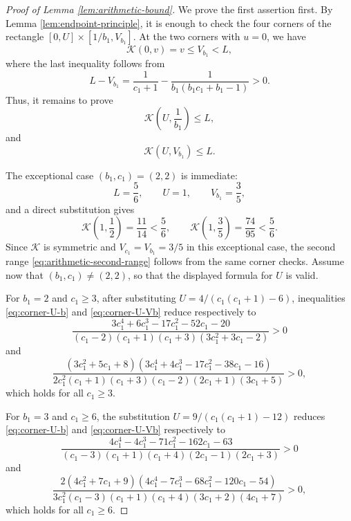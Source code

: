 \documentclass[10pt,a4paper]{amsart}
\newcommand{\Kfun}{\mathcal K}
\begin{document}
\begin{proof}[Proof of Lemma \ref{lem:arithmetic-bound}]
We prove the first assertion first.  By Lemma \ref{lem:endpoint-principle}, it
is enough to check the four corners of the rectangle
$[0,U]\times[1/b_1,V_{b_1}]$.  At the two corners with $u=0$, we have
$$
        \Kfun(0,v)=v\le V_{b_1}<L,
$$
where the last inequality follows from
$$
        L-V_{b_1}
        =\frac1{c_1+1}-\frac1{b_1(b_1c_1+b_1-1)}>0.
$$
Thus, it remains to prove
\begin{equation}\label{eq:corner-U-b}
        \Kfun\left(U,\frac{1}{b_1}\right)\le L,
\end{equation}
and
\begin{equation}\label{eq:corner-U-Vb}
        \Kfun(U,V_{b_1})\le L.
\end{equation}

The exceptional case $(b_1,c_1)=(2,2)$ is immediate:
$$
        L=\frac56,
        \qquad
        U=1,
        \qquad
        V_{b_1}=\frac35,
$$
and a direct substitution gives
$$
        \Kfun\left(1,\frac12\right)=\frac{11}{14}<\frac56,
        \qquad
        \Kfun\left(1,\frac35\right)=\frac{74}{95}<\frac56.
$$
Since $\Kfun$ is symmetric and $V_{c_1}=V_{b_1}=3/5$ in this exceptional case,
the second range \eqref{eq:arithmetic-second-range} follows from the same corner checks.  Assume now that
$(b_1,c_1)\ne(2,2)$, so that the displayed formula for $U$ is valid.

For $b_1=2$ and $c_1\geq3$, after substituting $U=4/(c_1(c_1+1)-6)$, inequalities
\eqref{eq:corner-U-b} and \eqref{eq:corner-U-Vb} reduce respectively to
$$
        \frac{3c_1^4+6c_1^3-17c_1^2-52c_1-20}{(c_1-2)(c_1+1)(c_1+3)(3c_1^2+3c_1-2)}>0
$$
and
$$
        \frac{(3c_1^2+5c_1+8)(3c_1^4+4c_1^3-17c_1^2-38c_1-16)}{2c_1^2(c_1+1)(c_1+3)(c_1-2)(2c_1+1)(3c_1+5)}>0,
$$
which holds for all $c_1\ge3$.

For $b_1=3$ and $c_1\geq6$, the substitution $U=9/(c_1(c_1+1)-12)$ reduces \eqref{eq:corner-U-b} and \eqref{eq:corner-U-Vb} respectively to
$$
        \frac{4c_1^4-4c_1^3-71c_1^2-162c_1-63}{(c_1-3)(c_1+1)(c_1+4)(2c_1-1)(2c_1+3)}>0
$$
and
$$
        \frac{2(4c_1^2+7c_1+9)(4c_1^4-7c_1^3-68c_1^2-120c_1-54)}{3c_1^2(c_1-3)(c_1+1)(c_1+4)(3c_1+2)(4c_1+7)}>0,
$$
which holds for all $c_1\geq6$.


\end{proof}
\end{document}
